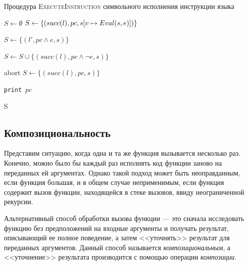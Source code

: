 \begin{algorithm}[H]
    \caption{Процедура \textsc{ExecuteInstruction} символьного исполнения инструкции языка} 
    \label{execute_instruction}
\begin{algorithmic}[1]
        \State $S \gets \emptyset$
                \State $S \gets \{(succ(l),pc,s[v\mapsto Eval(s, e)])\}$
            \EndCase

                    \State $S \gets \{(l', pc \land e, s)\}$
                \EndIf

                    \State $S \gets S\cup\{(succ(l), pc \land \neg e, s)\}$
                \EndIf
            \EndCase

             \label{executeInsOriginalAlgoAssert}
                    \State abort
                \Else
                    \State $S \gets \{(succ(l),pc,s)\}$
                \EndIf
            \EndCase 

                \State \texttt{print $pc$ }
            \EndCase
        \EndSwitch

        \State \Return S
    \EndProcedure
\end{algorithmic}
\end{algorithm}


\subsection{Композициональность}
Представим ситуацию, когда одна и та же функция вызывается несколько раз.
Конечно, можно было бы каждый раз исполнять код функции заново на переданных ей аргументах. 
Однако такой подход может быть неоправданным, если функция большая, и в общем случае неприменимым, 
если функция содержит вызов функции, находящейся в стеке вызовов, ввиду неограниченной рекурсии.  

Альтернативный способ обработки вызова функции --- это сначала исследовать функцию без предположений на входные аргументы
и получать результат, описывающий ее полное поведение, а затем <<уточнять>> результат для переданных аргументов.
Данный способ называется \emph{композициональным}, а <<уточнение>> результата производится с помощью операции \emph{композиции}.


